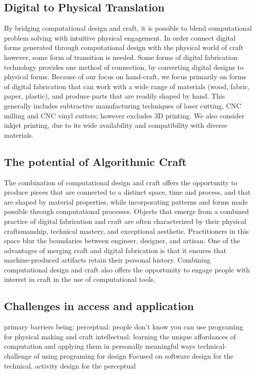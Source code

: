 \documentclass{sigchi}
\begin{document}
\subsection{Digital to Physical Translation}
By bridging computational design and craft, it is possible to blend computational problem solving with intuitive physical engagement. In order connect digital forms generated through computational design with the physical world of craft however, some form of transition is needed. Some forms of digital fabrication technology provides one method of connection, by converting digital designs to physical forms. Because of our focus on hand-craft, we focus primarily on forms of digital fabrication that can work with a wide range of materials (wood, fabric, paper, plastic), and produce parts that are readily shaped by hand. This generally includes subtractive manufacturing techniques of laser cutting, CNC milling and CNC vinyl cutters\cite{dunn}; however excludes 3D printing. We also consider inkjet printing, due to its wide availability and compatibility with diverse materials.

\subsection{The potential of Algorithmic Craft}
The combination of computational design and craft offers the opportunity to produce pieces that are connected to a distinct space, time and process, and that are shaped by material properties, while incorporating patterns and forms made possible through computational processes. Objects that emerge from a combined practice of digital fabrication and craft are often characterized by their physical craftsmanship, technical mastery, and exceptional aesthetic. Practitioners in this space blur the boundaries between engineer, designer, and artisan. One of the advantages of merging craft and digital fabrication is that it ensures that machine-produced artifacts retain their personal history. Combining computational design and craft also offers the opportunity to engage people with interest in craft in the use of computational tools.


\subsection{Challenges in access and application}
primary barriers being:
perceptual: people don't know you can use programing for physical making and craft
intellectual: learning the unique affordances of computation and applying them in personally meaningful ways
technical- challenge of using programing for design
Focused on software design for the technical, activity design for the perceptual
\end{document}
